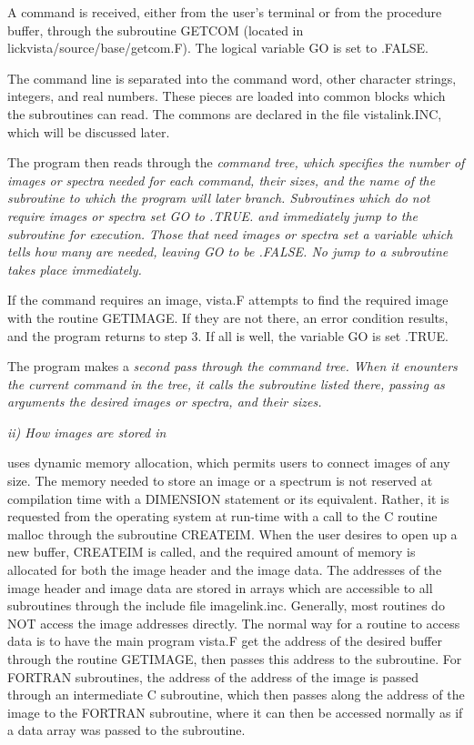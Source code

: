 \hang
{}A command is received, either
from the user's terminal or from the procedure buffer, through the
subroutine GETCOM (located in lickvista/source/base/getcom.F).  The
logical variable GO is set to .FALSE. 

\hang
{}The command line is separated
into the command word, other character strings, integers, and
real numbers. These pieces are loaded into common blocks which
the subroutines can read.  The commons are declared in the file
vistalink.INC, which will be discussed later. 

\hang
{}The program then reads through
the \it command tree\rm , which specifies the number of images or spectra
needed for each command, their sizes, and the name of the subroutine to which
the program will later branch.
Subroutines which do not require images or spectra set GO to
.TRUE. and immediately jump to the subroutine for execution. Those that need
images or spectra set a variable which tells how many are needed, leaving GO to
be .FALSE.  No jump to a subroutine takes place immediately. 

\hang
{}If the command requires an image,
vista.F attempts to find the required image with the routine GETIMAGE.  If
they are not there, an error condition results, and the program returns to step
3. If all is well, the variable GO is set .TRUE. 

\hang
{}The program makes a \it second \rm pass through
the command tree.
When it enounters the current command in the tree, it calls the subroutine
listed there, passing as arguments the desired images or spectra, and their
sizes. 

\Sskip
\centerline {\it ii) How images are stored in \V\rm}

\vskip 0.125in
\V uses dynamic memory allocation, which permits users to connect images of any
size. The memory needed to store an image or a spectrum is not reserved at
compilation time with a DIMENSION statement or its equivalent.  Rather, it is
requested from the operating system at run-time with a call to the C
routine malloc through the subroutine CREATEIM. When the user desires to
open up a new buffer, CREATEIM is called, and the required amount of
memory is allocated for both the image header and the image data. The
addresses of the image header and image data are stored in arrays which
are accessible to all subroutines through the include file imagelink.inc.
Generally, most routines do NOT access the image addresses directly.  The
normal way for a routine to access data is to have the main program vista.F
get the address of the desired buffer through the routine GETIMAGE, then
passes this address to the subroutine. For FORTRAN subroutines, the address
of the address of the image is passed through an intermediate C subroutine,
which then passes along the address of the image to the FORTRAN subroutine,
where it can then be accessed normally as if a data array was passed to
the subroutine.

